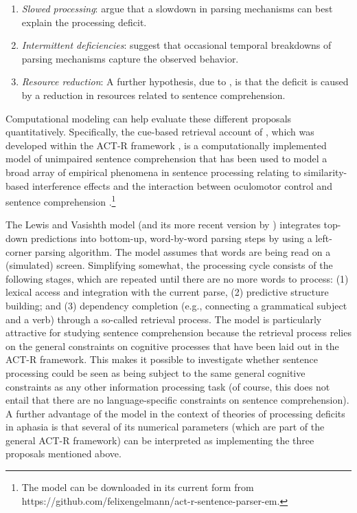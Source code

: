 \documentclass{cambridge7A}\usepackage[]{graphicx}\usepackage[]{color}
\begin{document}
\begin{enumerate}
 \item \textit{Slowed processing}:
  \cite{BurkhardtEtAl2003} argue that a slowdown in parsing mechanisms can best explain the processing deficit.  
\ \item \textit{Intermittent deficiencies}:
  \cite{CaplanEtAl2015} suggest that occasional temporal breakdowns of parsing mechanisms capture the observed behavior. 
  \item \textit{Resource reduction}:
  A further hypothesis, due to \cite{Caplan2012}, is that the deficit is caused by a reduction in resources related to sentence comprehension. 
\end{enumerate} 

Computational modeling can help evaluate these different proposals quantitatively. 
Specifically, the cue-based retrieval account of \cite{LewisVasishth2005}, which was developed within the ACT-R framework \citep{AndersonEtAl2004}, is a computationally implemented model of unimpaired sentence comprehension 
 that has been used to model a broad array of empirical phenomena in sentence processing relating to similarity-based interference effects 
\citep{NicenboimRetrieval2018,JaegerEngelmannVasishth2017,EngelmannJaegerVasishth2019} and the interaction between oculomotor control and sentence comprehension \citep{Engelmanna}.\footnote{The model can be downloaded in its current form from 
https://github.com/felixengelmann/act-r-sentence-parser-em.}

The Lewis and Vasishth model (and its more recent version by \cite{engelmann:phd}) integrates top-down predictions into bottom-up, word-by-word parsing steps by using a left-corner parsing algorithm. The model assumes that words are being read on a (simulated) screen. Simplifying somewhat, the processing cycle consists of the following stages, which are repeated until there are no more words to process: (1) lexical access and integration with the current parse, (2) predictive structure building; and (3) dependency completion (e.g., connecting a grammatical subject and a verb) through a so-called retrieval process. 
The \cite{LewisVasishth2005} model is particularly attractive for studying sentence comprehension because the retrieval process relies on the general constraints on cognitive processes that have been laid out in the ACT-R framework. This makes it possible to investigate whether sentence processing could be seen as being subject to the same general cognitive constraints as  any other information processing task (of course, this does not entail that there are no language-specific constraints on sentence comprehension).
A further advantage of the \cite{LewisVasishth2005} model in the context of theories of processing deficits in aphasia is that several of its numerical parameters (which are part of the general ACT-R framework) can be interpreted as implementing the three proposals mentioned above.
\end{document}
